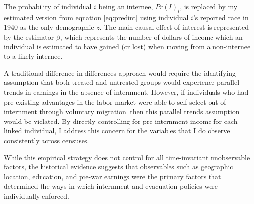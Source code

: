 The probability of individual $i$ being an internee, $Pr(I)_i$,
is replaced by my estimated version from equation \ref{eq:predint}
using individual $i$'s reported race in 1940 as the only demographic $z$.
The main causal effect of interest is represented by the estimator $\beta$,
which represents the number of dollars of income 
which an individual is estimated to have gained (or lost)
when moving from a non-internee to a likely internee.

A traditional difference-in-differences approach would require the
identifying assumption that both treated and untreated groups
would experience parallel trends in earnings in the absence of internment.
However, if individuals who had pre-existing advantages in the labor market
were able to self-select out of internment through voluntary migration,
then this parallel trends assumption would be violated.
By directly controlling for pre-internment income for each linked individual,
I address this concern for the variables that I do observe consistently
across censuses.

While this empirical strategy does not control 
for all time-invariant unobservable factors,
the historical evidence suggests that
observables such as geographic location, education, and pre-war earnings
were the primary factors that determined the ways in which
internment and evacuation policies were individually enforced.
